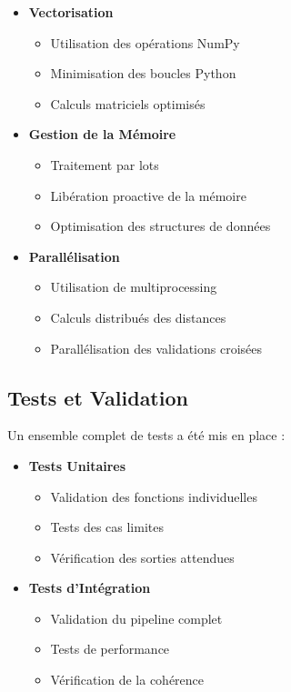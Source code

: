 \begin{itemize}
    \item \textbf{Vectorisation}
    \begin{itemize}
        \item Utilisation des opérations NumPy
        \item Minimisation des boucles Python
        \item Calculs matriciels optimisés
    \end{itemize}

    \item \textbf{Gestion de la Mémoire}
    \begin{itemize}
        \item Traitement par lots
        \item Libération proactive de la mémoire
        \item Optimisation des structures de données
    \end{itemize}

    \item \textbf{Parallélisation}
    \begin{itemize}
        \item Utilisation de multiprocessing
        \item Calculs distribués des distances
        \item Parallélisation des validations croisées
    \end{itemize}
\end{itemize}

\subsection{Tests et Validation}
Un ensemble complet de tests a été mis en place :

\begin{itemize}
    \item \textbf{Tests Unitaires}
    \begin{itemize}
        \item Validation des fonctions individuelles
        \item Tests des cas limites
        \item Vérification des sorties attendues
    \end{itemize}

    \item \textbf{Tests d'Intégration}
    \begin{itemize}
        \item Validation du pipeline complet
        \item Tests de performance
        \item Vérification de la cohérence
    \end{itemize}
\end{itemize}